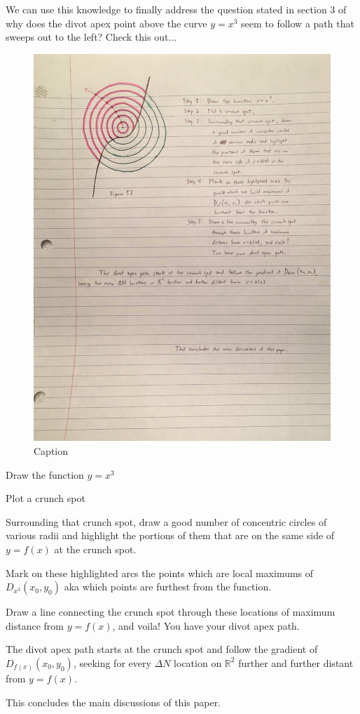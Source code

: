 We can use this knowledge to finally address the question stated in section 3 of why does the divot apex point above the curve $y = x^3$ seem to follow a path that sweeps out to the left? Check this out...


\begin{figure}
  \includegraphics[width=.9\linewidth]{solving-divot-paths-img/Fig 12-53.png}
  \caption{Caption}
  \label{fig:fig12-53}
\end{figure}

\begin{steps}
  \item Draw the function $y = x ^ 3$
  \item Plot a crunch spot
  \item Surrounding that crunch spot, draw a good number of concentric circles of various radii and highlight the portions of them that are on the same side of $y = f(x)$ at the crunch spot.
  \item Mark on these highlighted arcs the points which are local maximums of $D_{x^3}(x_0, y_0)$ aka which points are furthest from the function.
  \item Draw a line connecting the crunch spot through these locations of maximum distance from $y = f(x)$, and voila! You have your divot apex path.
\end{steps}

The divot apex path starts at the crunch spot and follow the gradient of $D_{f(x)}(x_0, y_0)$, seeking for every $\Delta N$ location on $\mathbb{R} ^ 2$ further and further distant from $y = f(x)$.

This concludes the main discussions of this paper.